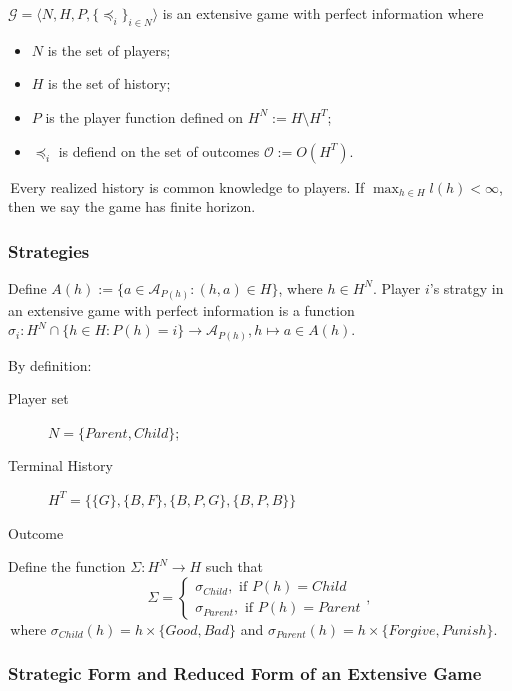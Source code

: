 \begin{definition}
    $\mathcal{G}=\langle N,H,P,\{\preceq_i\}_{i\in N} \rangle$ is an extensive game with perfect information where
    \begin{itemize}
        \item $N$ is the set of players;
        \item $H$ is the set of history;
        \item $P$ is the player function defined on $H^N:=H\setminus H^T$;
        \item $\preceq_i$ is defiend on the set of outcomes $\mathcal{O}:=O(H^T)$.
    \end{itemize}
    \,Every realized history is common knowledge to players. If $\max_{h\in H} l(h)<\infty$, then we say the game has finite horizon.
\end{definition}

\subsubsection{Strategies}
\begin{definition}[Strategy]
    Define $A(h):= \{a\in \mathcal{A}_{P(h)}: (h,a) \in H\}$, where $h\in H^N$. Player $i$'s stratgy in an extensive game with perfect information is a function $\sigma_i: H^N \cap \{h\in H: P(h)=i\} \to \mathcal{A}_{P(h)}, h \mapsto a\in A(h)$. 
\end{definition}

\begin{example}
    By definition:
    \begin{description}
        \item[Player set] $N=\{Parent, Child\}$;
        \item[Terminal History] $H^T=\{\{G\},\{B,F\},\{B,P,G\},\{B,P,B\}\}$
        \item[Outcome] 
    \end{description}
    Define the function $\Sigma: H^N\to H$ such that $$\Sigma=\begin{cases}
        \sigma_{Child}, \text{ if } P(h)=Child\\
        \sigma_{Parent}, \text{ if } P(h)=Parent
    \end{cases},$$
    \,where $\sigma_{Child}(h)=h\times \{Good, Bad\}$ and $\sigma_{Parent}(h)=h\times \{Forgive, Punish\}$.
\end{example}

\subsubsection{Strategic Form and Reduced Form of an Extensive Game}


